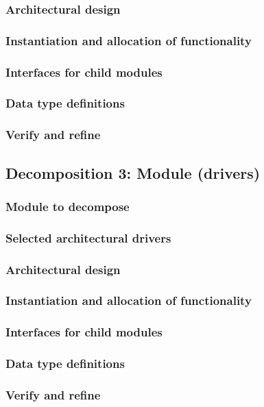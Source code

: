 \documentclass[a4paper,10pt]{article}
\begin{document}
\subsubsection{Architectural design}
\subsubsection{Instantiation and allocation of functionality}
\subsubsection{Interfaces for child modules}
\subsubsection{Data type definitions}
\subsubsection{Verify and refine}

\subsection{Decomposition 3: Module (drivers)}
\subsubsection{Module to decompose}
\subsubsection{Selected architectural drivers}
\subsubsection{Architectural design}
\subsubsection{Instantiation and allocation of functionality}
\subsubsection{Interfaces for child modules}
\subsubsection{Data type definitions}
\subsubsection{Verify and refine}
\end{document}
